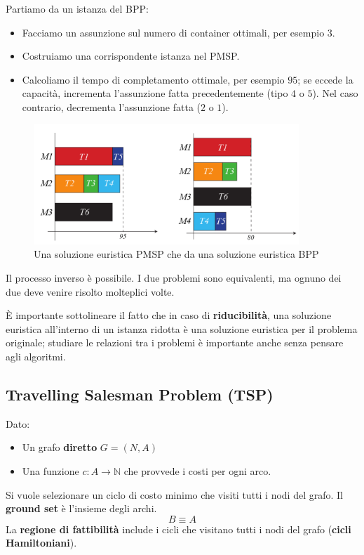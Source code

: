 \documentclass{article}
\begin{document}
Partiamo da un istanza del BPP:
\begin{itemize}
    \item Facciamo un assunzione sul numero di container ottimali, per esempio $3$.
    \item Costruiamo una corrispondente istanza nel PMSP.
    \item Calcoliamo il tempo di completamento ottimale, per esempio $95$; se eccede la capacità,
          incrementa l'assunzione fatta precedentemente (tipo $4$ o $5$). Nel caso contrario, decrementa
          l'assunzione fatta ($2$ o $1$).
\end{itemize}

\begin{figure}[H]
    \centering
    \includegraphics[width=10cm]{images/interlude5_BPP_scp.png}
    \caption{Una soluzione euristica PMSP che da una soluzione euristica BPP}
    \label{fig:interlude5_PMSP_BPP}
\end{figure}
Il processo inverso è possibile. I due problemi sono equivalenti, ma ognuno dei due deve venire risolto molteplici
volte.

È importante sottolineare il fatto che in caso di \textbf{riducibilità}, una soluzione euristica all'interno di un
istanza ridotta è una soluzione euristica per il problema originale; studiare le relazioni tra i problemi è importante
anche senza pensare agli algoritmi.

\subsection{Travelling Salesman Problem (TSP)}
Dato:
\begin{itemize}
    \item Un grafo \textbf{diretto} $G=(N,A)$
    \item Una funzione $c:A\rightarrow\mathbb{N}$ che provvede i costi per ogni arco.
\end{itemize}
Si vuole selezionare un ciclo di costo minimo che visiti tutti i nodi del grafo. Il \textbf{ground set} è l'insieme
degli archi.
$$B\equiv A$$
La \textbf{regione di fattibilità} include i cicli che visitano tutti i nodi del grafo (\textbf{cicli Hamiltoniani}).
\end{document}
